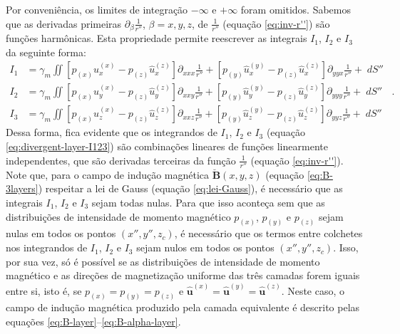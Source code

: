 Por conveniência, os limites de integração $-\infty$ e $+\infty$ foram omitidos.
Sabemos que as derivadas primeiras $\partial_{\beta} \frac{1}{r''}$, $\beta = x, y, z$, de 
$\frac{1}{r''}$ (equação \ref{eq:inv-r''}) são funções harmônicas. Esta propriedade permite 
reescrever as integrais $I_{1}$, $I_{2}$ e $I_{3}$ da seguinte forma:
\begin{equation}
\begin{split}
I_{1} &= \gamma_{m} \iint
\left[ p_{(x)} \hat{u}^{(x)}_{x} - p_{(z)} \hat{u}^{(z)}_{x} \right] \partial_{xxx} \frac{1}{r''} +
\left[ p_{(y)} \hat{u}^{(y)}_{x} - p_{(z)} \hat{u}^{(z)}_{x} \right] \partial_{yyx} \frac{1}{r''} +
\; dS'' \\
I_{2} &= \gamma_{m} \iint
\left[ p_{(x)} \hat{u}^{(x)}_{y} - p_{(z)} \hat{u}^{(z)}_{y} \right] \partial_{xxy} \frac{1}{r''} +
\left[ p_{(y)} \hat{u}^{(y)}_{y} - p_{(z)} \hat{u}^{(z)}_{y} \right] \partial_{yyy} \frac{1}{r''} +
\; dS'' \\
I_{3} &= \gamma_{m} \iint
\left[ p_{(x)} \hat{u}^{(x)}_{z} - p_{(z)} \hat{u}^{(z)}_{z} \right] \partial_{xxz} \frac{1}{r''} +
\left[ p_{(y)} \hat{u}^{(y)}_{z} - p_{(z)} \hat{u}^{(z)}_{z} \right] \partial_{yyz} \frac{1}{r''} +
\; dS''
\label{eq:divergent-layer-I123}
\end{split} \:\: .
\end{equation}
Dessa forma, fica evidente que os integrandos de $I_{1}$, $I_{2}$ e $I_{3}$ (equação \ref{eq:divergent-layer-I123}) 
são combinações lineares de funções linearmente independentes, que são derivadas 
terceiras da função $\frac{1}{r''}$ (equação \ref{eq:inv-r''}).
Note que, para o campo de indução magnética $\breve{\mathbf{B}}(x, y, z)$ (equação \ref{eq:B-3layers}) 
respeitar a lei de Gauss (equação \ref{eq:lei-Gauss}), é necessário que as integrais $I_{1}$, $I_{2}$ e $I_{3}$ 
sejam todas nulas.
Para que isso aconteça sem que as distribuições de intensidade de momento magnético 
$p_{(x)}$, $p_{(y)}$ e $p_{(z)}$ sejam nulas em todos os pontos $(x'', y'', z_{c})$, é necessário 
que os termos entre colchetes
nos integrandos de $I_{1}$, $I_{2}$ e $I_{3}$ sejam nulos em todos os pontos $(x'', y'', z_{c})$.
Isso, por sua vez, só é possível se as distribuições de intensidade de momento magnético 
e as direções de magnetização uniforme das três camadas forem iguais entre si, isto é, se 
$p_{(x)} = p_{(y)} = p_{(z)}$ e 
$\hat{\mathbf{u}}^{(x)} = \hat{\mathbf{u}}^{(y)} = \hat{\mathbf{u}}^{(z)}$.
Neste caso, o campo de indução magnética produzido pela camada equivalente é descrito pelas equações 
\ref{eq:B-layer}--\ref{eq:B-alpha-layer}.

